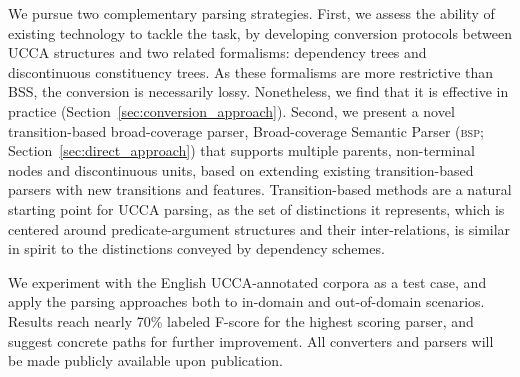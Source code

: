 \documentclass[11pt]{article}
\newcommand{\secref}[1]{Section~\ref{#1}}
\begin{document}
We pursue two complementary parsing strategies.
First, we assess the ability of existing technology to tackle the task,
by developing conversion protocols between UCCA structures and two related formalisms:
dependency trees and discontinuous constituency trees.
As these formalisms are more restrictive than BSS, the conversion
is necessarily lossy. Nonetheless, we find that it is effective
in practice (\secref{sec:conversion_approach}).
Second, we present a novel transition-based broad-coverage parser,
Broad-coverage Semantic Parser (\textsc{bsp}; \secref{sec:direct_approach})
that supports multiple parents, non-terminal nodes and discontinuous units,
based on extending existing transition-based parsers
with new transitions and features.
Transition-based methods are a natural starting point for UCCA parsing,
as the set of distinctions it represents, which is centered around predicate-argument
structures and their inter-relations, is similar in spirit to the distinctions
conveyed by dependency schemes.

We experiment with the English UCCA-annotated corpora \cite{abend2013universal}
as a test case,
and apply the parsing approaches both to in-domain and out-of-domain scenarios.
Results reach nearly 70\% labeled F-score for the highest
scoring parser, and suggest concrete paths for further improvement.
All converters and parsers will be made publicly available upon publication.



\end{document}
